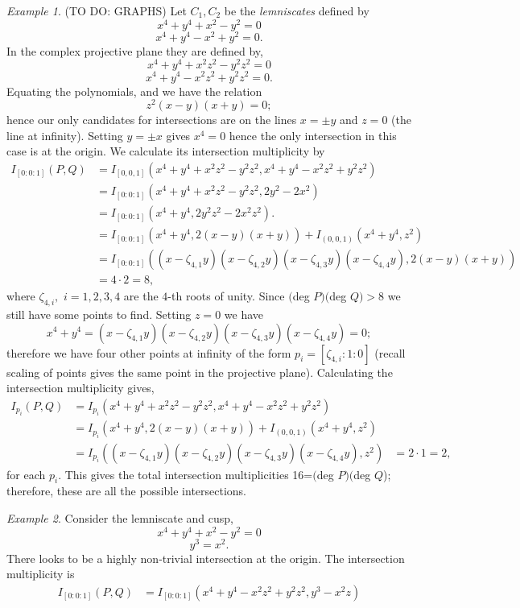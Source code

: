 \documentclass{article}
\theoremstyle{remark}
\newtheorem{example}{Example}[section]
\begin{document}
\begin{example} (TO DO: GRAPHS) Let $C_1,C_2$ be the \textit{lemniscates} defined by
\[x^4+y^4+x^2-y^2=0\]
\[x^4+y^4-x^2+y^2=0.\]
In the complex projective plane they are defined by,
\[x^4+y^4+x^2z^2-y^2z^2=0\]
\[x^4+y^4-x^2z^2+y^2z^2=0.\]
Equating the polynomials, and we have the relation
\[z^2(x-y)(x+y)=0;\]
hence our only candidates for intersections are on the lines $x=\pm y$ and $z=0$ (the line at infinity). Setting $y=\pm x$ gives $x^4=0$ hence the only intersection in this case is at the origin. We calculate its intersection multiplicity by\\
\begin{align*}
  I_{[0:0:1]} (P,Q) &=I_{[0,0,1]} (x^4+y^4+x^2z^2-y^2z^2,x^4+y^4-x^2z^2+y^2z^2)  \\
  &=I_{[0:0:1]} (x^4+y^4+x^2z^2-y^2z^2,2y^2-2x^2)  \\
  &=I_{[0:0:1]} (x^4+y^4,2y^2z^2-2x^2z^2).\\
   &=I_{[0:0:1]} (x^4+y^4,2(x-y)(x+y))+I_{(0,0,1)} (x^4+y^4,z^2)  \\
  &=I_{[0:0:1]} ((x-\zeta_{4,1}y)(x-\zeta_{4,2}y)(x-\zeta_{4,3}y)(x-\zeta_{4,4}y),2(x-y)(x+y))\\
  &=4\cdot 2=8,
\end{align*} 
where $\zeta_{4,i},$ $i=1,2,3,4$ are the $4$-th roots of unity. Since $($deg $P$$)($deg $Q)> 8$ we still have some points to find. Setting $z=0$ we have
\[ x^4+y^4=(x-\zeta_{4,1}y)(x-\zeta_{4,2}y)(x-\zeta_{4,3}y)(x-\zeta_{4,4}y)=0;\]
therefore we have four other points at infinity of the form $p_i=[\zeta_{4,i}:1:0]$ (recall scaling of points gives the same point in the projective plane). Calculating the intersection multiplicity gives,
\begin{align*}
I_{p_i} (P,Q) &=I_{p_i} (x^4+y^4+x^2z^2-y^2z^2,x^4+y^4-x^2z^2+y^2z^2)  \\
  &=I_{p_i} (x^4+y^4,2(x-y)(x+y))+I_{(0,0,1)} (x^4+y^4,z^2) \\
  &=I_{p_i} ((x-\zeta_{4,1}y)(x-\zeta_{4,2}y)(x-\zeta_{4,3}y)(x-\zeta_{4,4}y),z^2)
  &=2\cdot1=2,
\end{align*}
for each $p_i$. This gives the total intersection multiplicities 16=$($deg $P$$)($deg $Q$); therefore, these are all the possible intersections.
\end{example}
\par
\begin{example} Consider the lemniscate and cusp,
\[x^4+y^4+x^2-y^2=0\]
\[y^3=x^2.\]
There looks to be a highly non-trivial intersection at the origin. The intersection multiplicity is
 \begin{align*}
  I_{[0:0:1]} (P,Q) &=I_{[0:0:1]} (x^4+y^4-x^2z^2+y^2z^2,y^3-x^2z)  \\
\end{align*} 
\end{example}
\end{document}
